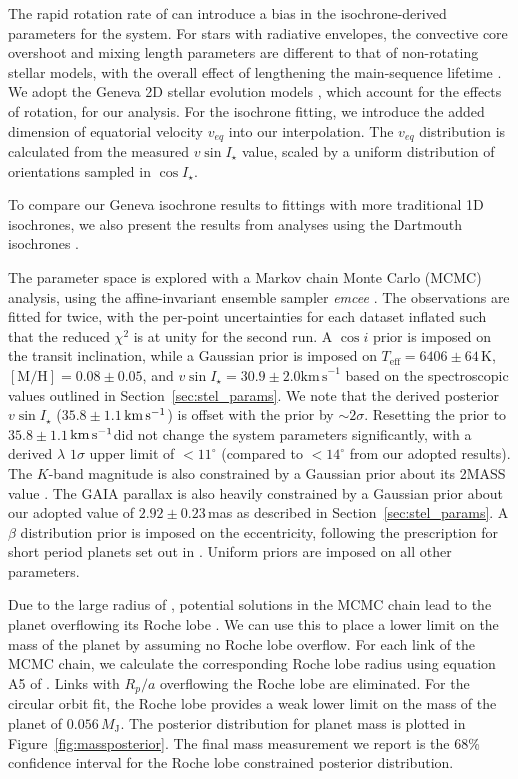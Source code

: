 \documentclass[apjl]{emulateapj}
\newcommand{\kms}{\ensuremath{\rm km\,s^{-1}}}
\newcommand{\vsini}{\ensuremath{v \sin{I_\star}}}
\newcommand{\hatcurisoshort}{Geneva}
\newcommand{\genevastarvsini}{\ensuremath{35.8\pm1.1}}             %
\begin{document}
The rapid rotation rate of \hatcur{} can introduce a bias in the isochrone-derived parameters for the system. For stars with radiative envelopes, the convective core overshoot and mixing length parameters are different to that of non-rotating stellar models, with the overall effect of lengthening the main-sequence lifetime \citep[e.g.][]{2000A&A...361..101M}. We adopt the \hatcurisoshort{} 2D stellar evolution models \citep{2012A&A...537A.146E}, which account for the effects of rotation, for our analysis. For the isochrone fitting, we introduce the added dimension of equatorial velocity $v_{eq}$ into our interpolation. The $v_{eq}$ distribution is calculated from the measured $v\sin I_\star$ value, scaled by a uniform distribution of orientations sampled in $\cos I_\star$. 

To compare our Geneva isochrone results to fittings with more traditional 1D isochrones, we also present the results from analyses using the Dartmouth isochrones \citep{2008ApJS..178...89D}.

The parameter space is explored with a Markov chain Monte Carlo (MCMC) analysis, using the affine-invariant ensemble sampler \emph{emcee} \citep{ForemanMackey:2012}. The observations are fitted for twice, with the per-point uncertainties for each dataset inflated such that the reduced $\chi^2$ is at unity for the second run. A $\cos i$ prior is imposed on the transit inclination, while a Gaussian prior is imposed on $T_\mathrm{eff} = 6406\pm 64\,\mathrm{K}$, $\mathrm{[M/H]}=0.08\pm0.05$, and $\vsini = 30.9\pm 2.0\mathrm{km\,s}^{-1}$ based on the spectroscopic values outlined in Section~\ref{sec:stel_params}. We note that the derived posterior $\vsini$ (\genevastarvsini\,\kms) is offset with the prior by $\sim 2\sigma$. Resetting the prior to \genevastarvsini\,\kms did not change the system parameters significantly, with a derived $\lambda$ $1\sigma$ upper limit of $<11^\circ$ (compared to $<14^\circ$ from our adopted results). The $K$-band magnitude is also constrained by a Gaussian prior about its 2MASS value \citep{Skrutskie:2006}. The GAIA parallax is also heavily constrained by a Gaussian prior about our adopted value of $2.92 \pm 0.23$\,mas as described in Section~\ref{sec:stel_params}. A $\beta$ distribution prior is imposed on the eccentricity, following the prescription for short period planets set out in \citet{2013MNRAS.434L..51K}. Uniform priors are imposed on all other parameters. 
 
Due to the large radius of \hatcurb{}, potential solutions in the MCMC chain lead to the planet overflowing its Roche lobe \citep[e.g.][]{2004A&A...418L...1L}. We can use this to place a lower limit on the mass of the planet by assuming no Roche lobe overflow. For each link of the MCMC chain, we calculate the corresponding Roche lobe radius using equation A5 of \citet{2011ApJ...742...59H}. Links with $R_p/a$ overflowing the Roche lobe are eliminated. For the circular orbit fit, the Roche lobe provides a weak lower limit on the mass of the planet of $0.056 \, M_\mathrm{J}$. The posterior distribution for planet mass is plotted in Figure~\ref{fig:massposterior}. The final mass measurement we report is the 68\% confidence interval for the Roche lobe constrained posterior distribution. 
\end{document}
